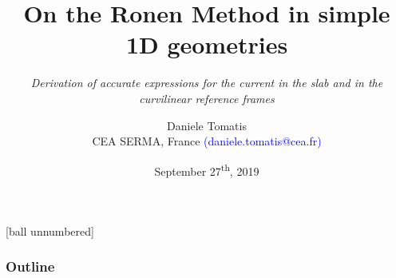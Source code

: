 \documentclass[black]{slideCEA}
\title{On the Ronen Method
       in simple 1D geometries}%
\subtitle{\textit{\normalsize Derivation of accurate expressions for the current in the slab and in the curvilinear reference frames}}
\date{September 27\textsuperscript{th}, 2019}
\author{Daniele Tomatis\\
        {\small \textcolor{ceared3}{CEA SERMA, France}
         \textcolor{blue}{(daniele.tomatis@cea.fr)}}}
\begin{document}
\theframetitle




\setcounter{tocdepth}{2}
[ball unnumbered]
\begin{frame}
  \frametitle{Outline}
\tableofcontents
\end{frame}


\end{document}
